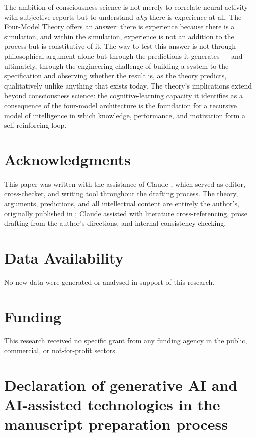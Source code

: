 \documentclass[12pt]{article}
\begin{document}
The ambition of consciousness science is not merely to correlate neural activity with subjective reports but to understand \emph{why} there is experience at all. The Four-Model Theory offers an answer: there is experience because there is a simulation, and within the simulation, experience is not an addition to the process but is constitutive of it. The way to test this answer is not through philosophical argument alone but through the predictions it generates --- and ultimately, through the engineering challenge of building a system to the specification and observing whether the result is, as the theory predicts, qualitatively unlike anything that exists today. The theory's implications extend beyond consciousness science: the cognitive-learning capacity it identifies as a consequence of the four-model architecture is the foundation for a recursive model of intelligence \citep{Gruber2026a} in which knowledge, performance, and motivation form a self-reinforcing loop.



\section*{Acknowledgments}


This paper was written with the assistance of Claude \citep{Anthropic2025}, which served as editor, cross-checker, and writing tool throughout the drafting process. The theory, arguments, predictions, and all intellectual content are entirely the author's, originally published in \citet{Gruber2015}; Claude assisted with literature cross-referencing, prose drafting from the author's directions, and internal consistency checking.

\section*{Data Availability}


No new data were generated or analysed in support of this research.

\section*{Funding}


This research received no specific grant from any funding agency in the public, commercial, or not-for-profit sectors.

\section*{Declaration of generative AI and AI-assisted technologies in the manuscript preparation process}
\end{document}
